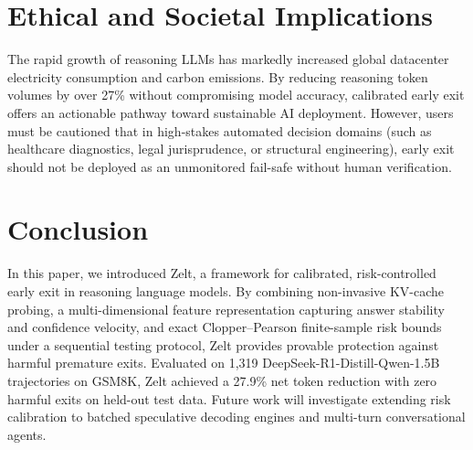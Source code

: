 \documentclass[11pt]{article}
\begin{document}
\section{Ethical and Societal Implications}
\label{sec:ethics}
The rapid growth of reasoning LLMs has markedly increased global datacenter electricity consumption and carbon emissions. By reducing reasoning token volumes by over 27\% without compromising model accuracy, calibrated early exit offers an actionable pathway toward sustainable AI deployment. However, users must be cautioned that in high-stakes automated decision domains (such as healthcare diagnostics, legal jurisprudence, or structural engineering), early exit should not be deployed as an unmonitored fail-safe without human verification.

\section{Conclusion}
\label{sec:conclusion}
In this paper, we introduced Zelt, a framework for calibrated, risk-controlled early exit in reasoning language models. By combining non-invasive KV-cache probing, a multi-dimensional feature representation capturing answer stability and confidence velocity, and exact Clopper--Pearson finite-sample risk bounds under a sequential testing protocol, Zelt provides provable protection against harmful premature exits. Evaluated on 1{,}319 DeepSeek-R1-Distill-Qwen-1.5B trajectories on GSM8K, Zelt achieved a 27.9\% net token reduction with zero harmful exits on held-out test data. Future work will investigate extending risk calibration to batched speculative decoding engines and multi-turn conversational agents.
\end{document}
